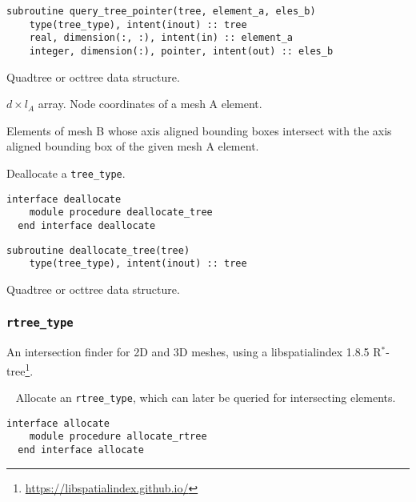 \documentclass{article}
\begin{document}
\begin{lstlisting}[language=FORTRAN]  
  subroutine query_tree_pointer(tree, element_a, eles_b)
    type(tree_type), intent(inout) :: tree
    real, dimension(:, :), intent(in) :: element_a
    integer, dimension(:), pointer, intent(out) :: eles_b
\end{lstlisting}

\begin{description}[font=\ttfamily\bfseries,leftmargin=2.2\parindent,labelindent=1.7\parindent,noitemsep]
  \item[tree] Quadtree or octtree data structure.
  \item[element\_a] $d \times l_A$ array. Node coordinates of a mesh A element.
  \item[eles\_b] Elements of mesh B whose axis aligned bounding boxes intersect
    with the axis aligned bounding box of the given mesh A element.
\end{description}

\noindent Deallocate a \verb+tree_type+.
  
\begin{lstlisting}[language=FORTRAN]
  interface deallocate
    module procedure deallocate_tree
  end interface deallocate
\end{lstlisting}
  
\begin{lstlisting}[language=FORTRAN]  
  subroutine deallocate_tree(tree)
    type(tree_type), intent(inout) :: tree
\end{lstlisting}

\begin{description}[font=\ttfamily\bfseries,leftmargin=2.2\parindent,labelindent=1.7\parindent,noitemsep]
  \item[tree] Quadtree or octtree data structure.
\end{description}

\subsubsection{\texttt{rtree\_type}}

An intersection finder for 2D and 3D meshes, using a libspatialindex 1.8.5
R${}^*$-tree\footnote{\url{https://libspatialindex.github.io/}}.

~\newline
Allocate an \verb+rtree_type+, which can later be queried for intersecting
elements.

\begin{lstlisting}[language=FORTRAN]
  interface allocate
    module procedure allocate_rtree
  end interface allocate
\end{lstlisting}
  
\end{document}

